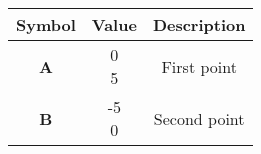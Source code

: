 \begin{tabular}[12pt]{ |c|c|c|}
    \hline
    \textbf{Symbol} & \textbf{Value} & \textbf{Description} \\
    \hline
    \textbf{A} & \myvec{0\\5} & First point\\
    \hline 
    \textbf{B} & \myvec{-5\\0} & Second point\\
    \hline
    \end{tabular}
